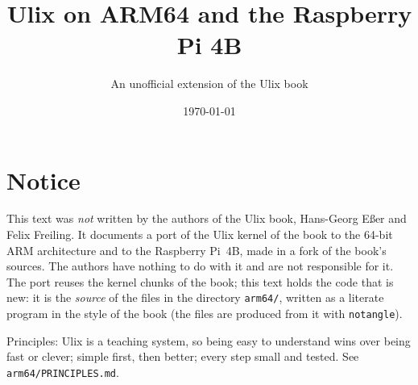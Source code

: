 \documentclass[a4paper,11pt]{book}
\title{Ulix on ARM64 and the Raspberry Pi 4B}
\author{An unofficial extension of the Ulix book}
\date{\today}
\begin{document}
\maketitle
\chapter*{Notice}
This text was \emph{not} written by the authors of the Ulix book, Hans-Georg E\ss er and Felix Freiling. It documents a
port of the Ulix kernel of the book to the 64-bit ARM architecture and to the Raspberry Pi~4B, made in a fork of the book's
sources. The authors have nothing to do with it and are not responsible for it. The port reuses the kernel chunks of the
book; this text holds the code that is new: it is the \emph{source} of the files in the directory \texttt{arm64/}, written
as a literate program in the style of the book (the files are produced from it with \texttt{notangle}).

Principles: Ulix is a teaching system, so being easy to understand wins over being fast or clever; simple first, then better;
every step small and tested. See \texttt{arm64/PRINCIPLES.md}.
\tableofcontents

\end{document}
